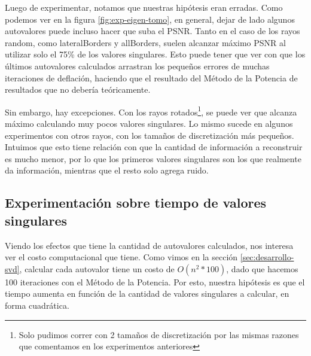 Luego de experimentar, notamos que nuestras hipótesis eran erradas.
Como podemos ver en la figura \ref{fig:exp-eigen-tomo}, en general,
dejar de lado algunos autovalores puede incluso hacer que suba el PSNR.
Tanto en el caso de los rayos random, como lateralBorders y allBorders,
suelen alcanzar máximo PSNR al utilizar solo el 75\% de los valores singulares.
Esto puede tener que ver con que los últimos autovalores calculados
arrastran los pequeños errores de muchas iteraciones de deflación,
haciendo que el resultado del Método de la Potencia de resultados que no debería teóricamente.

Sin embargo, hay excepciones.
Con los rayos rotados\footnote{Solo pudimos correr con 2 tamaños de discretización
por las mismas razones que comentamos en los experimentos anteriores},
se puede ver que alcanza máximo calculando muy pocos valores singulares.
Lo mismo sucede en algunos experimentos con otros rayos, con los tamaños de discretización más pequeños.
Intuimos que esto tiene relación con que la cantidad de información a reconstruir es mucho menor,
por lo que los primeros valores singulares son los que realmente da información, mientras que el resto solo agrega ruido.

\subsection{Experimentación sobre tiempo de valores singulares}
Viendo los efectos que tiene la cantidad de autovalores calculados,
nos interesa ver el costo computacional que tiene.
Como vimos en la sección \ref{sec:desarrollo-svd},
calcular cada autovalor tiene un costo de $O(n^2 * 100)$,
dado que hacemos 100 iteraciones con el Método de la Potencia.
Por esto, nuestra hipótesis es que el tiempo aumenta en función de la cantidad de valores singulares a calcular,
en forma cuadrática.

